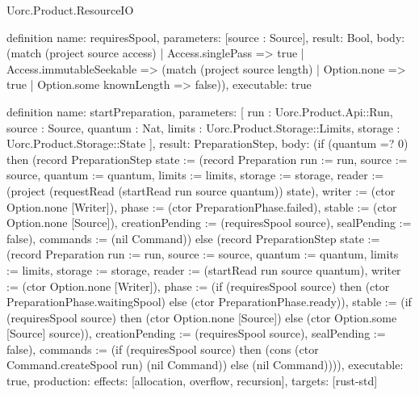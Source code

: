 \begin{lexlean}{Uorc.Product.ResourceIO}
\begin{semanticmodule}
definition{
  name: requiresSpool,
  parameters: [source : Source],
  result: Bool,
  body: (match (project source access)
    | Access.singlePass => true
    | Access.immutableSeekable => (match (project source length)
      | Option.none => true
      | Option.some knownLength => false)),
  executable: true
}

definition{
  name: startPreparation,
  parameters: [
    run : Uorc.Product.Api::Run,
    source : Source,
    quantum : Nat,
    limits : Uorc.Product.Storage::Limits,
    storage : Uorc.Product.Storage::State
  ],
  result: PreparationStep,
  body: (if (quantum =? 0) then (record PreparationStep {state := (record Preparation {run := run, source := source, quantum := quantum, limits := limits, storage := storage, reader := (project (requestRead (startRead run source quantum)) state), writer := (ctor Option.none [Writer]), phase := (ctor PreparationPhase.failed), stable := (ctor Option.none [Source]), creationPending := (requiresSpool source), sealPending := false}), commands := (nil Command)}) else (record PreparationStep {state := (record Preparation {run := run, source := source, quantum := quantum, limits := limits, storage := storage, reader := (startRead run source quantum), writer := (ctor Option.none [Writer]), phase := (if (requiresSpool source) then (ctor PreparationPhase.waitingSpool) else (ctor PreparationPhase.ready)), stable := (if (requiresSpool source) then (ctor Option.none [Source]) else (ctor Option.some [Source] source)), creationPending := (requiresSpool source), sealPending := false}), commands := (if (requiresSpool source) then (cons (ctor Command.createSpool run) (nil Command)) else (nil Command))})),
  executable: true,
  production: {effects: [allocation, overflow, recursion], targets: [rust-std]}
}


\end{semanticmodule}
\end{lexlean}
